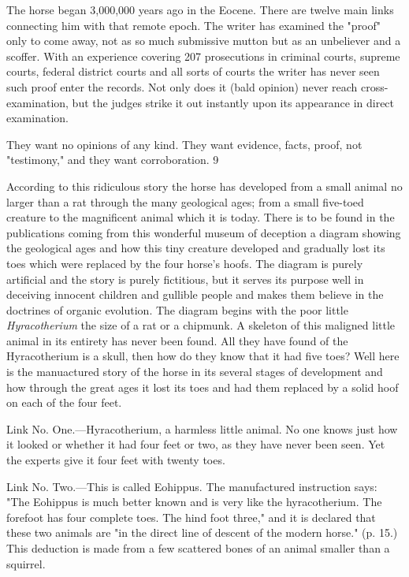 The horse began 3,000,000 years ago in the Eocene. There are twelve main links connecting
him with that remote epoch. The writer has examined the "proof" only to come away, not as
so much submissive mutton but as an unbeliever and a scoffer. With an experience covering
207 prosecutions in criminal courts, supreme courts, federal district courts and all sorts of
courts the writer has never seen such proof enter the records. Not only does it (bald opinion)
never reach cross-examination, but the judges strike it out instantly upon its appearance in
direct examination.

They want no opinions of any kind. They want evidence, facts, proof, not "testimony," and
they want corroboration. 9

According to this ridiculous story the horse has developed from a small animal no larger than
a rat through the many geological ages; from a small five-toed creature to the magnificent
animal which it is today. There is to be found in the publications coming from this wonderful
museum of deception a diagram showing the geological ages and how this tiny creature
developed and gradually lost its toes which were replaced by the four horse's hoofs. The
diagram is purely artificial and the story is purely fictitious, but it serves its purpose well in
deceiving innocent children and gullible people and makes them believe in the doctrines of
organic evolution. The diagram begins with the poor little \textit{Hyracotherium} the size of a rat or
a chipmunk. A skeleton of this maligned little animal in its entirety has never been found. All
they have found of the Hyracotherium is a skull, then how do they know that it had five toes?
Well here is the manuactured story of the horse in its several stages of development and how
through the great ages it lost its toes and had them replaced by a solid hoof on each of the
four feet.

Link No. One.—Hyracotherium, a harmless little animal. No one knows just how it looked or
whether it had four feet or two, as they have never been seen. Yet the experts give it four feet
with twenty toes.

Link No. Two.—This is called Eohippus. The manufactured instruction says: "The Eohippus
is much better known and is very like the hyracotherium. The forefoot has four complete
toes. The hind foot three," and it is declared that these two animals are "in the direct line of
descent of the modern horse." (p. 15.) This deduction is made from a few scattered bones of
an animal smaller than a squirrel.

